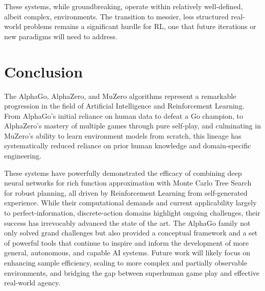 \documentclass[11pt,a4paper]{article}
\begin{document}
These systems, while groundbreaking, operate within relatively well-defined, albeit complex, environments. The transition to messier, less structured real-world problems remains a significant hurdle for RL, one that future iterations or new paradigms will need to address.

\section{Conclusion}
The AlphaGo, AlphaZero, and MuZero algorithms represent a remarkable progression in the field of Artificial Intelligence and Reinforcement Learning. From AlphaGo's initial reliance on human data to defeat a Go champion, to AlphaZero's mastery of multiple games through pure self-play, and culminating in MuZero's ability to learn environment models from scratch, this lineage has systematically reduced reliance on prior human knowledge and domain-specific engineering.

These systems have powerfully demonstrated the efficacy of combining deep neural networks for rich function approximation with Monte Carlo Tree Search for robust planning, all driven by Reinforcement Learning from self-generated experience. While their computational demands and current applicability largely to perfect-information, discrete-action domains highlight ongoing challenges, their success has irrevocably advanced the state of the art. The AlphaGo family not only solved grand challenges but also provided a conceptual framework and a set of powerful tools that continue to inspire and inform the development of more general, autonomous, and capable AI systems. Future work will likely focus on enhancing sample efficiency, scaling to more complex and partially observable environments, and bridging the gap between superhuman game play and effective real-world agency.

\clearpage

\nocite{*}
\printbibliography%
\end{document}

